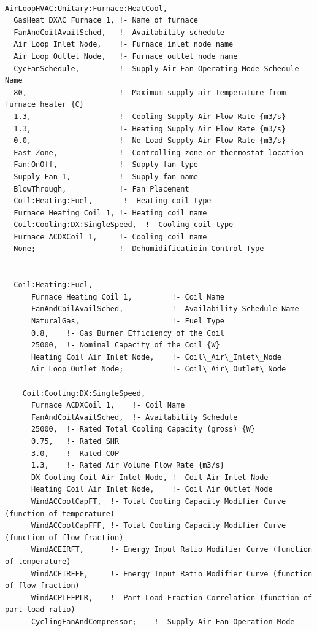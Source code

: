 \begin{lstlisting}

AirLoopHVAC:Unitary:Furnace:HeatCool,
  GasHeat DXAC Furnace 1, !- Name of furnace
  FanAndCoilAvailSched,   !- Availability schedule
  Air Loop Inlet Node,    !- Furnace inlet node name
  Air Loop Outlet Node,   !- Furnace outlet node name
  CycFanSchedule,         !- Supply Air Fan Operating Mode Schedule Name
  80,                     !- Maximum supply air temperature from furnace heater {C}
  1.3,                    !- Cooling Supply Air Flow Rate {m3/s}
  1.3,                    !- Heating Supply Air Flow Rate {m3/s}
  0.0,                    !- No Load Supply Air Flow Rate {m3/s}
  East Zone,              !- Controlling zone or thermostat location
  Fan:OnOff,              !- Supply fan type
  Supply Fan 1,           !- Supply fan name
  BlowThrough,            !- Fan Placement
  Coil:Heating:Fuel,       !- Heating coil type
  Furnace Heating Coil 1, !- Heating coil name
  Coil:Cooling:DX:SingleSpeed,  !- Cooling coil type
  Furnace ACDXCoil 1,     !- Cooling coil name
  None;                   !- Dehumidificatioin Control Type


  Coil:Heating:Fuel,
      Furnace Heating Coil 1,         !- Coil Name
      FanAndCoilAvailSched,           !- Availability Schedule Name
      NaturalGas,                     !- Fuel Type
      0.8,    !- Gas Burner Efficiency of the Coil
      25000,  !- Nominal Capacity of the Coil {W}
      Heating Coil Air Inlet Node,    !- Coil\_Air\_Inlet\_Node
      Air Loop Outlet Node;           !- Coil\_Air\_Outlet\_Node

    Coil:Cooling:DX:SingleSpeed,
      Furnace ACDXCoil 1,    !- Coil Name
      FanAndCoilAvailSched,  !- Availability Schedule
      25000,  !- Rated Total Cooling Capacity (gross) {W}
      0.75,   !- Rated SHR
      3.0,    !- Rated COP
      1.3,    !- Rated Air Volume Flow Rate {m3/s}
      DX Cooling Coil Air Inlet Node, !- Coil Air Inlet Node
      Heating Coil Air Inlet Node,    !- Coil Air Outlet Node
      WindACCoolCapFT,  !- Total Cooling Capacity Modifier Curve (function of temperature)
      WindACCoolCapFFF, !- Total Cooling Capacity Modifier Curve (function of flow fraction)
      WindACEIRFT,      !- Energy Input Ratio Modifier Curve (function of temperature)
      WindACEIRFFF,     !- Energy Input Ratio Modifier Curve (function of flow fraction)
      WindACPLFFPLR,    !- Part Load Fraction Correlation (function of part load ratio)
      CyclingFanAndCompressor;    !- Supply Air Fan Operation Mode


\end{lstlisting}
